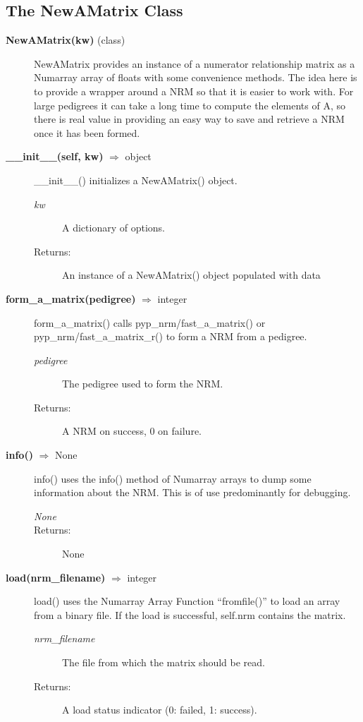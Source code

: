 \subsection*{The NewAMatrix Class}
\begin{description}
\item[\textbf{NewAMatrix(kw)} (class)]
NewAMatrix provides an instance of a numerator relationship matrix as a Numarray array of floats with some convenience methods. The idea here is to provide a wrapper around a NRM so that it is easier to work with. For large pedigrees it can take a long time to compute the elements of A, so there is real value in providing an easy way to save and retrieve a NRM once it has been formed.

\item[\textbf{\_\_init\_\_(self, kw)} $\Rightarrow$ object]
\_\_init\_\_() initializes a NewAMatrix() object.
\begin{description}
\item[\emph{kw}] A dictionary of options.
\item[Returns:] An instance of a NewAMatrix() object populated with data
\end{description}

\item[\textbf{form\_a\_matrix(pedigree)} $\Rightarrow$ integer]
form\_a\_matrix() calls pyp\_nrm/fast\_a\_matrix() or pyp\_nrm/fast\_a\_matrix\_r() to form a NRM from a pedigree.
\begin{description}
\item[\emph{pedigree}] The pedigree used to form the NRM.
\item[Returns:] A NRM on success, 0 on failure.
\end{description}

\item[\textbf{info()} $\Rightarrow$ None]
info() uses the info() method of Numarray arrays to dump some information about the NRM. This is of use predominantly for debugging.
\begin{description}
\item[\emph{None}]
\item[Returns:] None
\end{description}

\item[\textbf{load(nrm\_filename)} $\Rightarrow$ integer]
load() uses the Numarray Array Function ``fromfile()'' to load an array from a binary file. If the load is successful, self.nrm contains the matrix.
\begin{description}
\item[\emph{nrm\_filename}] The file from which the matrix should be read.
\item[Returns:] A load status indicator (0: failed, 1: success).
\end{description}


\end{description}
